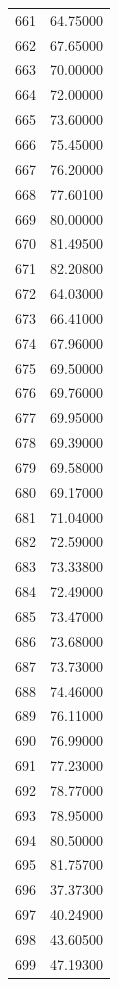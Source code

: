 \documentclass[
  letterpaper,
  DIV=11,
  numbers=noendperiod]{scrreprt}
\begin{document}
\begin{tcolorbox}
\begin{tabular}{lr}
661  &         64.75000 \\
662  &         67.65000 \\
663  &         70.00000 \\
664  &         72.00000 \\
665  &         73.60000 \\
666  &         75.45000 \\
667  &         76.20000 \\
668  &         77.60100 \\
669  &         80.00000 \\
670  &         81.49500 \\
671  &         82.20800 \\
672  &         64.03000 \\
673  &         66.41000 \\
674  &         67.96000 \\
675  &         69.50000 \\
676  &         69.76000 \\
677  &         69.95000 \\
678  &         69.39000 \\
679  &         69.58000 \\
680  &         69.17000 \\
681  &         71.04000 \\
682  &         72.59000 \\
683  &         73.33800 \\
684  &         72.49000 \\
685  &         73.47000 \\
686  &         73.68000 \\
687  &         73.73000 \\
688  &         74.46000 \\
689  &         76.11000 \\
690  &         76.99000 \\
691  &         77.23000 \\
692  &         78.77000 \\
693  &         78.95000 \\
694  &         80.50000 \\
695  &         81.75700 \\
696  &         37.37300 \\
697  &         40.24900 \\
698  &         43.60500 \\
699  &         47.19300 \\

\end{tabular}
\end{tcolorbox}
\end{document}
